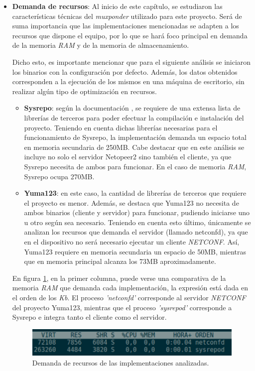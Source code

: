 \begin{itemize}
	\item \textbf{Demanda de recursos}: Al inicio de este capítulo, se estudiaron las características técnicas del \textit{muxponder} utilizado para este proyecto. Será de suma importancia que las implementaciones mencionadas se adapten a los recursos que dispone el equipo, por lo que se hará foco principal en demanda de la memoria \textit{RAM} y de la memoria de almacenamiento. 
	
	Dicho esto, es importante mencionar que para el siguiente análisis se iniciaron los binarios con la configuración por defecto. Además, los datos obtenidos corresponden a la ejecución de los mismos en una máquina de escritorio, sin realizar algún tipo de optimización en recursos.

	\begin{itemize}
		\item \textbf{Sysrepo}: según la documentación \parencite{sysrepoinstall}, se requiere de una extensa lista de librerías de terceros para poder efectuar la compilación e instalación del proyecto. Teniendo en cuenta dichas librerías necesarias para el funcionamiento de Sysrepo, la implementación demanda un espacio total en memoria secundaria de 250MB. Cabe destacar que en este análisis se incluye no solo el servidor Netopeer2 sino también el cliente, ya que Sysrepo necesita de ambos para funcionar. En el caso de memoria \textit{RAM}, Sysrepo ocupa 270MB.

		\item \textbf{Yuma123}: en este caso, la cantidad de librerías de terceros que requiere el proyecto \parencite{yuma123} es menor. Además, se destaca que Yuma123 no necesita de ambos binarios (cliente y servidor) para funcionar, pudiendo iniciarse uno u otro según sea necesario. Teniendo en cuenta esto último, únicamente se analizan los recursos que demanda el servidor (llamado netconfd), ya que en el dispositivo no será necesario ejecutar un cliente \textit{NETCONF}. Así, Yuma123 requiere en memoria secundaria un espacio de 50MB, mientras que en memoria principal alcanza los 73MB aproximadamente.

	\end{itemize}
	
	
	En figura \ref{fig:consumoagentes}, en la primer columna, puede verse una comparativa de la memoria \textit{RAM} que demanda cada implementación, la expresión está dada en el orden de los \textit{Kb}. El proceso \textit{'netconfd'} corresponde al servidor \textit{NETCONF} del proyecto Yuma123, mientras que el proceso \textit{'sysrepod'} corresponde a Sysrepo e integra tanto el cliente como el servidor.


	\begin{figure}[H]
		\centering
		\includegraphics[scale=0.80]{Figures/consumoagentes.pdf}
		\caption{Demanda de recursos de las implementaciones analizadas.}
		\label{fig:consumoagentes}
	  \end{figure}
	\end{itemize}


